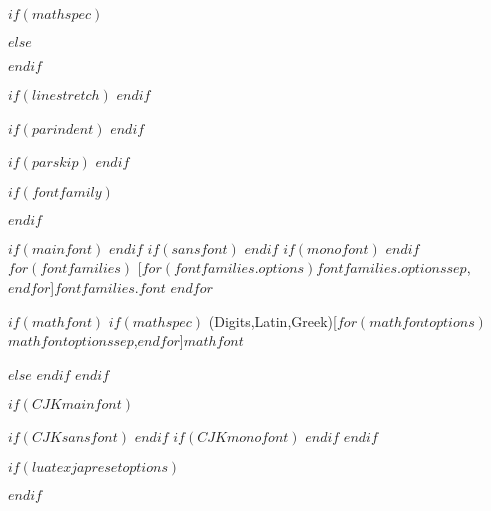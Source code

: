 \usepackage{hyperref}

\ifPDFTeX
  \usepackage{textcomp} %
\else %
$if(mathspec)$
  \ifXeTeX
    \usepackage{mathspec} %
  \else
    \usepackage{unicode-math} %
  \fi
$else$
  \usepackage{unicode-math}
$endif$
\fi


\setlength{\headsep}{1cm}
\setlength{\footskip}{1cm}
\checkandfixthelayout


\renewcommand{\familydefault}{\sfdefault}

$if(linestretch)$
\renewcommand{\baselinestretch}{$linestretch$}
$endif$

$if(parindent)$
\setlength{\parindent}{$parindent$}
$endif$

$if(parskip)$
\setlength{\parskip}{$parskip$}
$endif$

$if(fontfamily)$
\usepackage[$for(fontfamilyoptions)$$fontfamilyoptions$$sep$,$endfor$]{$fontfamily$}
$endif$

\ifPDFTeX\else
$if(mainfont)$
$endif$
$if(sansfont)$
$endif$
$if(monofont)$
$endif$
$for(fontfamilies)$
  [$for(fontfamilies.options)$$fontfamilies.options$$sep$,$endfor$]{$fontfamilies.font$}
$endfor$

$if(mathfont)$
$if(mathspec)$
  \ifXeTeX
    \setmathfont(Digits,Latin,Greek)[$for(mathfontoptions)$$mathfontoptions$$sep$,$endfor$]{$mathfont$}
  \else
  \fi

$else$
$endif$
$endif$

$if(CJKmainfont)$
  \ifXeTeX
    \usepackage{xeCJK}
$if(CJKsansfont)$
$endif$
$if(CJKmonofont)$
$endif$
  \fi
$endif$

$if(luatexjapresetoptions)$
  \ifLuaTeX
    \usepackage[$for(luatexjapresetoptions)$$luatexjapresetoptions$$sep$,$endfor$]{luatexja-preset}
  \fi
$endif$

